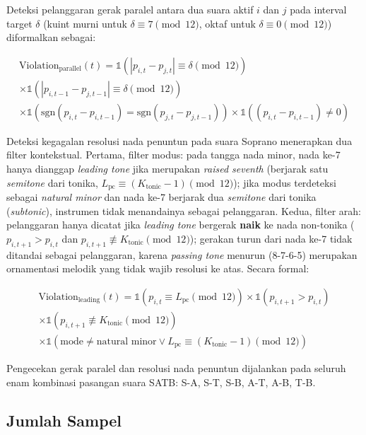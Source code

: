 Deteksi pelanggaran gerak paralel antara dua suara aktif $i$ dan $j$ pada interval target $\delta$ (kuint murni untuk $\delta \equiv 7 \pmod{12}$, oktaf untuk $\delta \equiv 0 \pmod{12}$) diformalkan sebagai:

{\small
\begin{multline}
\text{Violation}_{\text{parallel}}(t) = \mathds{1}\left(|p_{i,t} - p_{j,t}| \equiv \delta \pmod{12}\right) \\
\times \mathds{1}\left(|p_{i,t-1} - p_{j,t-1}| \equiv \delta \pmod{12}\right) \\
\times \mathds{1}\left(\text{sgn}(p_{i,t} - p_{i,t-1}) = \text{sgn}(p_{j,t} - p_{j,t-1})\right) \times \mathds{1}\left((p_{i,t} - p_{i,t-1}) \neq 0\right)
\end{multline}
}

Deteksi kegagalan resolusi nada penuntun pada suara Soprano menerapkan dua filter kontekstual. Pertama, filter modus: pada tangga nada minor, nada ke-7 hanya dianggap \textit{leading tone} jika merupakan \textit{raised seventh} (berjarak satu \textit{semitone} dari tonika, $L_{\text{pc}} \equiv (K_{\text{tonic}} - 1) \pmod{12}$); jika modus terdeteksi sebagai \textit{natural minor} dan nada ke-7 berjarak dua \textit{semitone} dari tonika (\textit{subtonic}), instrumen tidak menandainya sebagai pelanggaran. Kedua, filter arah: pelanggaran hanya dicatat jika \textit{leading tone} bergerak \textbf{naik} ke nada non-tonika ($p_{i,t+1} > p_{i,t}$ dan $p_{i,t+1} \not\equiv K_{\text{tonic}} \pmod{12}$); gerakan turun dari nada ke-7 tidak ditandai sebagai pelanggaran, karena \textit{passing tone} menurun (8-7-6-5) merupakan ornamentasi melodik yang tidak wajib resolusi ke atas. Secara formal:

{\small
\begin{multline}
\text{Violation}_{\text{leading}}(t) = \mathds{1}\left(p_{i,t} \equiv L_{\text{pc}} \pmod{12}\right) \times \mathds{1}\left(p_{i,t+1} > p_{i,t}\right) \\
\times \mathds{1}\left(p_{i,t+1} \not\equiv K_{\text{tonic}} \pmod{12}\right) \\
\times \mathds{1}\left(\text{mode} \neq \text{natural minor} \lor L_{\text{pc}} \equiv (K_{\text{tonic}} - 1) \pmod{12}\right)
\end{multline}
}

Pengecekan gerak paralel dan resolusi nada penuntun dijalankan pada seluruh enam kombinasi pasangan suara SATB: S-A, S-T, S-B, A-T, A-B, T-B.

\subsection{Jumlah Sampel}

